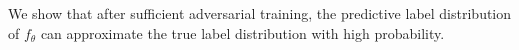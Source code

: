 We show that after sufficient adversarial training, the predictive label distribution of $f_\theta$ can approximate the true label distribution with high probability. 
